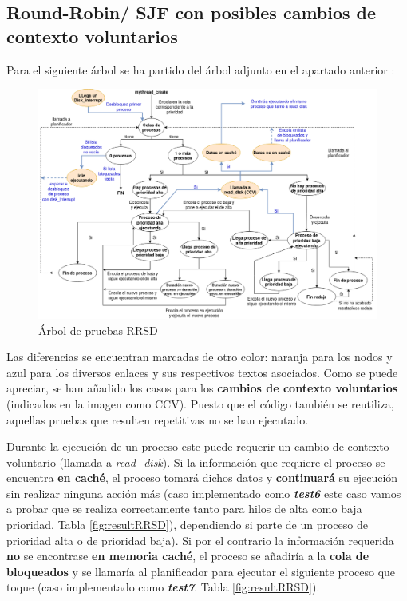 \documentclass[10pt, spanish, pdftex]{template/UC3M_document}
\begin{document}
\subsection{Round-Robin/ SJF con posibles cambios de contexto voluntarios}
Para el siguiente árbol se ha partido del árbol adjunto en el apartado anterior :
\vspace{0.5cm}
\begin{figure}[h]
    \centering
    \includegraphics[width=15cm]{arboles/testRRSD.png}
    \caption{Árbol de pruebas RRSD}
\end{figure}

\newpage
Las diferencias se encuentran marcadas de otro color: naranja para los nodos y azul para los diversos enlaces y sus respectivos textos asociados. Como se puede apreciar, se han añadido los casos para los \textbf{cambios de contexto voluntarios} (indicados en la imagen como CCV). Puesto que el código también se reutiliza, aquellas pruebas que resulten repetitivas no se han ejecutado.

Durante la ejecución de un proceso este puede requerir un cambio de contexto voluntario (llamada a \textit{read\_disk}). Si la información que requiere el proceso se encuentra \textbf{en caché}, el proceso tomará dichos datos y \textbf{continuará} su ejecución sin realizar ninguna acción más (caso implementado como \textbf{\textit{test6}} este caso vamos a probar que se realiza correctamente tanto para hilos de alta como baja prioridad. Tabla \ref{fig:resultRRSD}), dependiendo si parte de un proceso de prioridad alta o de prioridad baja). Si por el contrario la información requerida \textbf{no} se encontrase \textbf{en memoria caché}, el proceso se añadiría a la \textbf{cola de bloqueados} y se llamaría al planificador para ejecutar el siguiente proceso que toque (caso implementado como \textbf{\textit{test7}}. Tabla \ref{fig:resultRRSD}).
\end{document}
